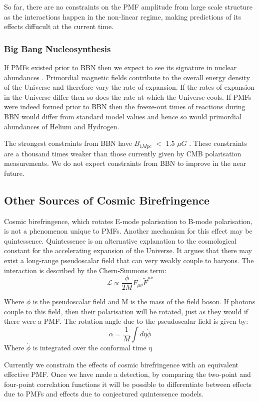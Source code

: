 So far, there are no constraints on the PMF amplitude from large scale structure as the interactions happen in the non-linear regime, making predictions of its effects diffucult at the current time.


\subsubsection{Big Bang Nucleosynthesis}

If PMFs existed prior to BBN then we expect to see its signature in nuclear abundances \cite{PhysRevD.86.063003}. Primordial magnetic fields contribute to the overall energy density of the Universe and therefore vary the rate of expansion. If the rates of expansion in the Universe differ then so does the rate at which the Universe cools. If PMFs were indeed formed prior to BBN then the freeze-out times of reactions during BBN would differ from standard model values and hence so would primordial abundances of Helium and Hydrogen.

The strongest constraints from BBN have $B_{1Mpc}$ $<$ 1.5 $\mu G$ \cite{PhysRevD.86.063003}. These constraints are a thousand times weaker than those currently given by CMB polarisation measurements. We do not expect constraints from BBN to improve in the near future.

\subsection{Other Sources of Cosmic Birefringence}
Cosmic birefringence, which rotates E-mode polarisation to B-mode polarisation, is not a phenomenon unique to PMFs. Another mechanism for this effect may be quintessence. Quintessence is an alternative explanation to the cosmological constant for the accelerating expansion of the Universe. It argues that there may exist a long-range pseudoscalar field that can very weakly couple to baryons. The interaction is described by the Chern-Simmons term:
\begin{equation}
\label{eqn:chern}
\mathcal{L} \propto \frac{\phi}{2M}F_{\mu \nu}\tilde{F}^{\mu \nu}
\end{equation}

Where $\phi$ is the pseudoscalar field and M is the mass of the field boson. If photons couple to this field, then their polarisation will be rotated, just as they would if there were a PMF. The rotation angle due to the pseudoscalar field is given by:
\begin{equation}
\label{eqn:rotation}
\alpha = \frac{1}{M} \int{d\eta \dot{\phi}}
\end{equation}
Where $\dot{\phi}$ is integrated over the conformal time $\eta$

Currently we constrain the effects of cosmic birefringence with an equivalent effective PMF. Once we have made a detection, by comparing the two-point and four-point correlation functions it will be possible to differentiate between effects due to PMFs and effects due to conjectured quintessence models. \cite{Ade:2015cao}




